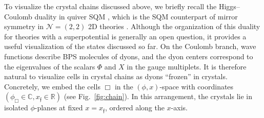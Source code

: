\documentclass[10pt]{article}
\theoremstyle{definition}
\def\ff{\mathfrak{f}}
\numberwithin{equation}{section}
\begin{document}
To visualize the crystal chains discussed above, we briefly recall the Higgs--Coulomb duality in quiver SQM \cite{Manschot:2013qma,Galakhov:2018lta,Beaujard:2021pii,Galakhov:2023aev}, which is the SQM counterpart of mirror symmetry in $\mathcal{N}=(2,2)$ 2D theories \cite{Hori:2000kt,Aganagic:2001uw,Hori:2013ika,Galakhov:2020upa}.
Although the organization of this duality for theories with a superpotential is generally an open question, it provides a useful visualization of the states discussed so far.
On the Coulomb branch, wave functions describe BPS molecules of dyons, and the dyon centers correspond to the eigenvalues of the scalars $\Phi$ and $X$ in the gauge multiplets.
It is therefore natural to visualize cells in crystal chains as dyons ``frozen'' in crystals.
Concretely, we embed the cells $\Box$ in the $(\phi,x)$-space with coordinates $(\phi_{\Box}\in\mathbb{C},x_{\ff}\in\mathbb{R})$ (see Fig.~\ref{fig:chain}).
In this arrangement, the crystals lie in isolated $\phi$-planes at fixed $x=x_{\ff}$, ordered along the $x$-axis.
\end{document}
